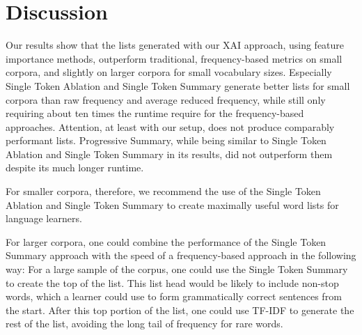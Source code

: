 \section{Discussion} \label{sec:results-discussion}
Our results show that the lists generated with our XAI approach, using feature importance methods, outperform traditional, frequency-based metrics on small corpora, and slightly on larger corpora for small vocabulary sizes.
Especially Single Token Ablation and Single Token Summary generate better lists for small corpora than raw frequency and average reduced frequency, while still only requiring about ten times the runtime require for the frequency-based approaches.
Attention, at least with our setup, does not produce comparably performant lists.
Progressive Summary, while being similar to Single Token Ablation and Single Token Summary in its results, did not outperform them despite its much longer runtime.

For smaller corpora, therefore, we recommend the use of the Single Token Ablation and Single Token Summary to create maximally useful word lists for language learners.

For larger corpora, one could combine the performance of the Single Token Summary approach with the speed of a frequency-based approach in the following way:
For a large sample of the corpus, one could use the Single Token Summary to create the top of the list.
This list head would be likely to include non-stop words, which a learner could use to form grammatically correct sentences from the start.
After this top portion of the list, one could use TF-IDF to generate the rest of the list, avoiding the long tail of frequency for rare words.







